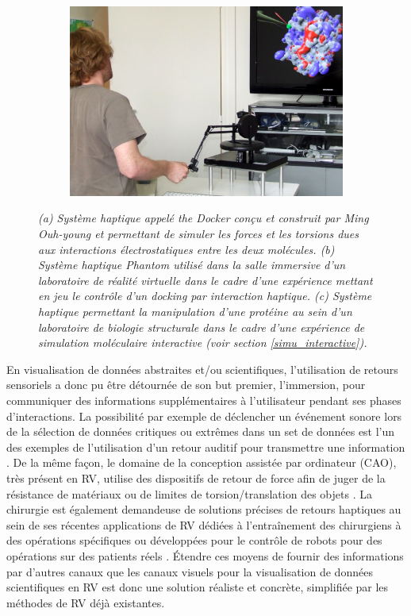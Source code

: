 \begin{figure}[h]
\begin{subfigure}{.33\textwidth}
  {\includegraphics[width=0.9\linewidth]{./figures/ch2/ferey_haptic}}
    \caption{}
    \label{Fig:ferey_haptic}
  \end{subfigure}
  \caption[Système haptique \textit{the Docker}. (b) Système haptique Phantom. (c) Système haptique permettant la manipulation d'une protéine.]{\it (a) Système haptique appelé \textit{the Docker} conçu et construit par Ming Ouh-young et permettant de simuler les forces et les torsions dues aux interactions électrostatiques entre les deux molécules.
  (b) Système haptique Phantom utilisé dans la salle immersive d'un laboratoire de réalité virtuelle dans le cadre d'une expérience mettant en jeu le contrôle d'un docking par interaction haptique. 
  (c) Système haptique permettant la manipulation d'une protéine au sein d'un laboratoire de biologie structurale dans le cadre d'une expérience de simulation moléculaire interactive (voir section \ref{simu_interactive}).
  }
\end{figure}

En visualisation de données abstraites et/ou scientifiques, l'utilisation  de retours sensoriels a donc pu être détournée de son but premier, l'immersion, pour communiquer des informations supplémentaires à l'utilisateur pendant ses phases d'interactions. La possibilité par exemple de déclencher un événement sonore lors de la sélection de données critiques ou extrêmes dans un set de données est l'un des exemples de l'utilisation d'un retour auditif pour transmettre une information \cite{ferey_multisensory_2009}. De la même façon, le domaine de la conception assistée par ordinateur (CAO), très présent en RV, utilise des dispositifs de retour de force afin de juger de la résistance de matériaux ou de limites de torsion/translation des objets \cite{sun2010haptic}. La chirurgie est également demandeuse de solutions précises de retours haptiques au sein de ses récentes applications de RV dédiées à l’entraînement des chirurgiens à des opérations spécifiques ou développées pour le contrôle de robots pour des opérations sur des patients réels \cite{kusumoto_application_2006}. Étendre ces moyens de fournir des informations par d'autres canaux que les canaux visuels pour la visualisation de données scientifiques en RV est donc une solution réaliste et concrète, simplifiée par les méthodes de RV déjà existantes.

